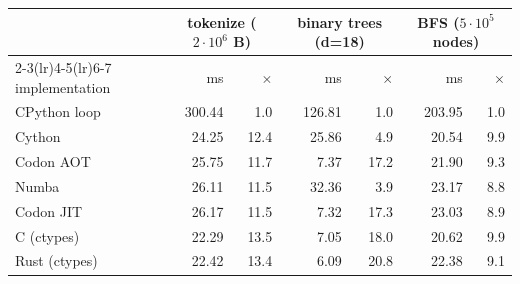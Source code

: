 \begin{tabular}{lrrrrrr}
\toprule
& \multicolumn{2}{c}{tokenize ($2{\cdot}10^6$ B)} & \multicolumn{2}{c}{binary trees (d{=}18)} & \multicolumn{2}{c}{BFS ($5{\cdot}10^5$ nodes)} \\
\cmidrule(lr){2-3}\cmidrule(lr){4-5}\cmidrule(lr){6-7}
implementation & ms & $\times$ & ms & $\times$ & ms & $\times$ \\
\midrule
CPython loop & 300.44 & 1.0 & 126.81 & 1.0 & 203.95 & 1.0 \\
Cython & 24.25 & 12.4 & 25.86 & 4.9 & 20.54 & 9.9 \\
Codon AOT & 25.75 & 11.7 & 7.37 & 17.2 & 21.90 & 9.3 \\
Numba & 26.11 & 11.5 & 32.36 & 3.9 & 23.17 & 8.8 \\
Codon JIT & 26.17 & 11.5 & 7.32 & 17.3 & 23.03 & 8.9 \\
C (ctypes) & 22.29 & 13.5 & 7.05 & 18.0 & 20.62 & 9.9 \\
Rust (ctypes) & 22.42 & 13.4 & 6.09 & 20.8 & 22.38 & 9.1 \\
\bottomrule
\end{tabular}
